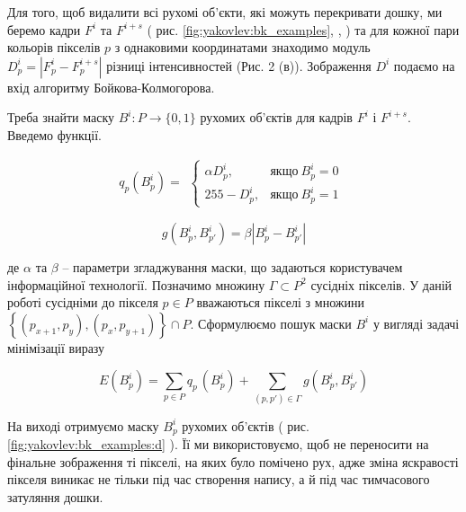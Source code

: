 Для того, щоб видалити всі рухомі об'єкти, які можуть перекривати дошку, ми
беремо кадри \(F^{i}\) та \(F^{i + s}\)  ( рис. \ref{fig:yakovlev:bk_examples},
,
) та для
кожної пари кольорів пікселів \(p\) з однаковими координатами знаходимо
модуль \(D_{p}^{i} = \left| F_{p}^{i} - F_{p}^{i + s} \right|\) різниці
інтенсивностей (Рис. 2 (в)). Зображення \(D^{i}\) подаємо на вхід
алгоритму Бойкова-Колмогорова.

Треба знайти маску $B^{i}:P \rightarrow \{0,1\}$ рухомих
об'єктів для кадрів \(F^{i}\) і \(F^{i + s}\).
Введемо функції.

\begin{equation}
	q_{p}(B_{p}^{i}) =
	\begin{gathered}
		\begin{cases}
			\alpha D_{p}^{i}, & якщо\ B_{p}^{i} = 0 \\
			255 - D_{p}^{i},  & якщо\ B_{p}^{i} = 1 
		\end{cases}
	\end{gathered}
\end{equation}

\begin{equation}
	g(B_{p}^{i},B_{p'}^{i}) = \beta|B_{p}^{i} - B_{p'}^{i}|
\end{equation}

де \(\alpha\) та \(\beta\) -- параметри згладжування маски, що задаються
користувачем інформаційної технології. Позначимо множину
$\Gamma \subset P^{2}$ сусідніх пікселів. У даній роботі сусідніми до
пікселя \(p \in P\) вважаються пікселі з множини
\(\left\{ \left( p_{x + 1},p_{y} \right),\left( p_{x},p_{y + 1} \right) \right\} \cap P\).
Сформулюємо пошук маски \(B^{i}\) у вигляді задачі мінімізації виразу

\begin{equation}
	E\left( B_{p}^{i} \right) = \sum_{p \in P}^{}{q_{{p\ }}( B_{p}^{i}) +}\sum_{(p,p') \in \Gamma}^{}g(B_{p}^{i},B_{p'}^{i})
\end{equation}


На виході отримуємо маску \(B_{p}^{i}\) рухомих об'єктів ( рис.
\ref{fig:yakovlev:bk_examples:d} ).
Її ми використовуємо, щоб не переносити на фінальне зображення ті
пікселі, на яких було помічено рух, адже зміна яскравості пікселя
виникає не тільки під час створення напису, а й під час тимчасового
затуляння дошки.


